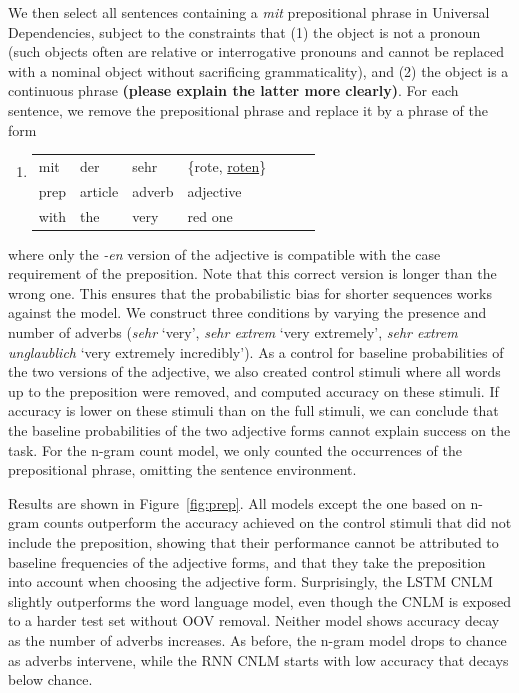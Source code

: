 We then select all sentences containing a \emph{mit} prepositional phrase in Universal Dependencies, subject to the constraints that (1) the object is not a pronoun (such objects often are relative or interrogative pronouns and cannot be replaced with a nominal object without sacrificing grammaticality), and (2) the object is a continuous phrase \textbf{(please explain the latter more clearly)}. For each sentence, we remove the prepositional phrase and replace it by a phrase of the form
\begin{enumerate}[label={(\arabic*)}]
	\item \begin{tabular}[t]{lllllll}
	mit & der & sehr& \{rote, \underline{roten}\} \\
	prep & article  & adverb & adjective \\
	with & the & very  & red one 
\end{tabular}
\end{enumerate}
where only the \emph{-en} version of the adjective is compatible with
the case requirement of the preposition. Note that this correct
version is longer than the wrong one. This ensures that the
probabilistic bias for shorter sequences works against the model.  We
construct three conditions by varying the presence and number of
adverbs (\emph{sehr} `very', \emph{sehr extrem} `very extremely',
\emph{sehr extrem unglaublich} `very extremely incredibly').  As a
control for baseline probabilities of the two versions of the
adjective, we also created control stimuli where all words up to the
preposition were removed, and computed accuracy on these stimuli.  If
accuracy is lower on these stimuli than on the full stimuli, we can
conclude that the baseline probabilities of the two adjective forms
cannot explain success on the task. For the n-gram count model, we
only counted the occurrences of the prepositional phrase, omitting the
sentence environment.

%
%
Results are shown in Figure~\ref{fig:prep}. All models except the one
based on n-gram counts outperform the accuracy achieved on the control
stimuli that did not include the preposition, showing that their
performance cannot be attributed to baseline frequencies of the
adjective forms, and that they take the preposition into account when
choosing the adjective form.  Surprisingly, the LSTM CNLM slightly
outperforms the word language model, even though the CNLM is exposed
to a harder test set without OOV removal.  Neither model shows
accuracy decay as the number of adverbs increases.  As before, the
n-gram model drops to chance as adverbs intervene, while the RNN CNLM
starts with low accuracy that decays below chance.

